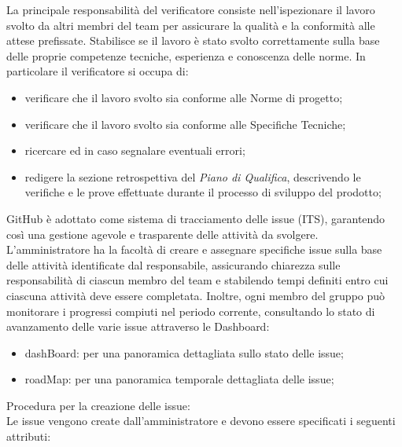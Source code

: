 La principale responsabilità del verificatore consiste nell’ispezionare il lavoro svolto da altri membri del team per assicurare la qualità e la conformità alle attese prefissate. Stabilisce se il lavoro è stato svolto correttamente sulla base delle proprie competenze tecniche, esperienza e conoscenza delle norme.
In particolare il verificatore si occupa di:
\begin{itemize}
	\item verificare che il lavoro svolto sia conforme alle Norme di progetto;
	\item verificare che il lavoro svolto sia conforme alle Specifiche Tecniche;
	\item ricercare ed in caso segnalare eventuali errori;
	\item redigere la sezione retrospettiva del \textit{Piano di Qualifica}, descrivendo le verifiche e le prove effettuate durante il processo di sviluppo del prodotto;
\end{itemize}
GitHub è adottato come sistema di tracciamento delle issue (ITS), garantendo così una gestione agevole e trasparente delle attività da svolgere.
L’amministratore ha la facoltà di creare e assegnare specifiche issue sulla base delle attività identificate dal responsabile, assicurando chiarezza sulle responsabilità di ciascun membro del team e stabilendo tempi definiti entro cui ciascuna attività deve essere completata. Inoltre, ogni membro del gruppo può monitorare i progressi compiuti nel periodo corrente, consultando lo stato di avanzamento delle varie issue attraverso le Dashboard:
\begin{itemize}
	\item dashBoard: per una panoramica dettagliata sullo stato delle issue;
	\item roadMap: per una panoramica temporale dettagliata delle issue;
\end{itemize}
Procedura per la creazione delle issue:\\
Le issue vengono create dall’amministratore e devono essere specificati i seguenti attributi:
